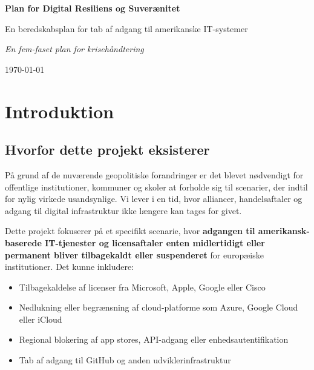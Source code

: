 \documentclass[a4paper,11pt,oneside]{book}
\newcommand{\doctitle}{Plan for Digital Resiliens og Suverænitet}
\def\tightlist{}
\begin{document}
\begin{titlepage}
    \centering
    \vspace*{2cm}
    {\Huge\bfseries \doctitle\par}
    \vspace{1cm}
    {\Large En beredskabsplan for tab af adgang til amerikanske IT-systemer\par}
    \vspace{2cm}

    \vspace{2cm}
    {\Large\itshape En fem-faset plan for krisehåndtering\par}
    \vfill

    {\large \today\par}
\end{titlepage}

\frontmatter
\tableofcontents
\newpage

\mainmatter
\chapter{Introduktion}\label{introduktion}

\section{Hvorfor dette projekt
eksisterer}\label{hvorfor-dette-projekt-eksisterer}

På grund af de nuværende geopolitiske forandringer er det blevet
nødvendigt for offentlige institutioner, kommuner og skoler at forholde
sig til scenarier, der indtil for nylig virkede usandsynlige. Vi lever i
en tid, hvor alliancer, handelsaftaler og adgang til digital
infrastruktur ikke længere kan tages for givet.

Dette projekt fokuserer på et specifikt scenarie, hvor \textbf{adgangen
til amerikansk-baserede IT-tjenester og licensaftaler enten midlertidigt
eller permanent bliver tilbagekaldt eller suspenderet} for europæiske
institutioner. Det kunne inkludere:

\begin{itemize}
\tightlist
\item
  Tilbagekaldelse af licenser fra Microsoft, Apple, Google eller Cisco
\item
  Nedlukning eller begrænsning af cloud-platforme som Azure, Google
  Cloud eller iCloud
\item
  Regional blokering af app stores, API-adgang eller
  enhedsautentifikation
\item
  Tab af adgang til GitHub og anden udviklerinfrastruktur
\end{itemize}
\end{document}

